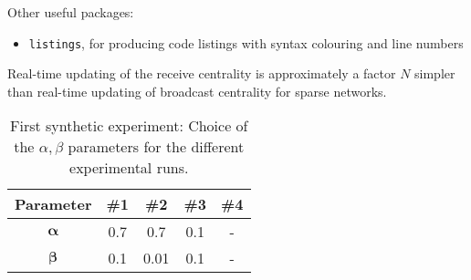 \noindent Other useful packages:
\begin{itemize}
\item \texttt{listings}, for producing code listings with syntax colouring and line numbers
\end{itemize}


\begin{highlightedParagraphC}
 \begin{remark}
     Real-time updating of the receive centrality is approximately a factor $N$ simpler than real-time updating of broadcast centrality for sparse networks.
 \end{remark}
\end{highlightedParagraphC}

\begin{table}[ht]
            \bigskip
		\centering %
		\begin{tabular}{c c c c c} %
			\hline\hline %
			\textbf{Parameter} & \textbf{\#1} & \textbf{\#2} & \textbf{\#3} & \textbf{\#4} \\ [0.1ex] %
			\hline\hline 
			$\mathbf{\alpha}$ & 0.7 & 0.7 & 0.1 & -\\ %
			$\mathbf{\beta}$ & 0.1 & 0.01 & 0.1 & - \\ [0.5ex] %
			\hline %
		\end{tabular}
		\caption{First synthetic experiment: Choice of the $\alpha,\beta$ parameters for the different experimental runs.} 
       \label{table:parameters} 
\end{table}

\newpage

